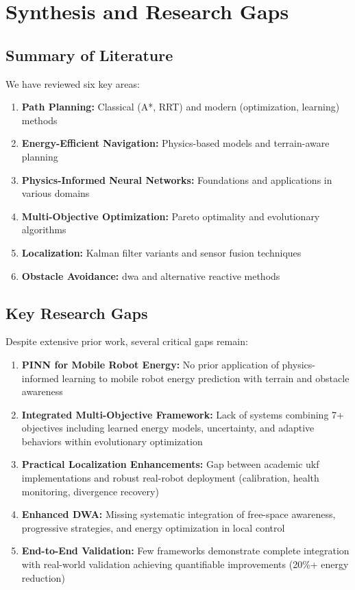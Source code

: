 \section{Synthesis and Research Gaps}
\label{sec:lit_gaps}

\subsection{Summary of Literature}

We have reviewed six key areas:
\begin{enumerate}
    \item \textbf{Path Planning:} Classical (A*, RRT) and modern (optimization, learning) methods
    \item \textbf{Energy-Efficient Navigation:} Physics-based models and terrain-aware planning
    \item \textbf{Physics-Informed Neural Networks:} Foundations and applications in various domains
    \item \textbf{Multi-Objective Optimization:} Pareto optimality and evolutionary algorithms
    \item \textbf{Localization:} Kalman filter variants and sensor fusion techniques
    \item \textbf{Obstacle Avoidance:} \acrshort{dwa} and alternative reactive methods
\end{enumerate}

\subsection{Key Research Gaps}

Despite extensive prior work, several critical gaps remain:

\begin{enumerate}
    \item \textbf{PINN for Mobile Robot Energy:} No prior application of physics-informed learning to mobile robot energy prediction with terrain and obstacle awareness

    \item \textbf{Integrated Multi-Objective Framework:} Lack of systems combining 7+ objectives including learned energy models, uncertainty, and adaptive behaviors within evolutionary optimization

    \item \textbf{Practical Localization Enhancements:} Gap between academic \acrshort{ukf} implementations and robust real-robot deployment (calibration, health monitoring, divergence recovery)

    \item \textbf{Enhanced DWA:} Missing systematic integration of free-space awareness, progressive strategies, and energy optimization in local control

    \item \textbf{End-to-End Validation:} Few frameworks demonstrate complete integration with real-world validation achieving quantifiable improvements (20\%+ energy reduction)
\end{enumerate}

